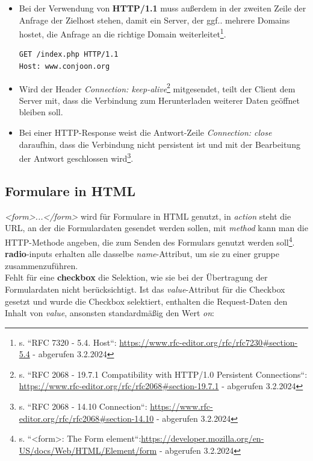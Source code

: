 \begin{itemize}
    \item Bei der Verwendung von \textbf{HTTP/1.1} muss außerdem in der zweiten Zeile der Anfrage der Zielhost stehen, damit ein Server, der {ggf..} mehrere Domains hostet, die Anfrage an die richtige Domain weiterleitet\footnote{s. ``RFC 7320 - 5.4.  Host``: \url{https://www.rfc-editor.org/rfc/rfc7230#section-5.4} - abgerufen 3.2.2024}.
    \begin{verbatim}
GET /index.php HTTP/1.1
Host: www.conjoon.org
    \end{verbatim}
    \item Wird der Header \textit{Connection: keep-alive}\footnote{
    s. ``RFC 2068 - 19.7.1 Compatibility with HTTP/1.0 Persistent Connections``: \url{https://www.rfc-editor.org/rfc/rfc2068#section-19.7.1} - abgerufen 3.2.2024
    } mitgesendet, teilt der Client dem Server mit, dass die Verbindung zum Herunterladen weiterer Daten geöffnet bleiben soll.
    \item Bei einer HTTP-Response weist die Antwort-Zeile \textit{Connection: close} daraufhin, dass die Verbindung nicht persistent ist und mit der Bearbeitung der Antwort geschlossen wird\footnote{
    s. ``RFC 2068 - 14.10 Connection``: \url{https://www.rfc-editor.org/rfc/rfc2068#section-14.10} - abgerufen 3.2.2024
    }.
\end{itemize}

\subsection{Formulare in HTML}

\textit{<form>...</form>} wird für Formulare in HTML genutzt, in \textit{action} steht die URL, an der die Formulardaten gesendet werden sollen, mit \textit{method} kann man die HTTP-Methode angeben, die zum Senden des Formulars genutzt werden soll\footnote{
s. ``<form>: The Form element``:\url{https://developer.mozilla.org/en-US/docs/Web/HTML/Element/form} - abgerufen 3.2.2024
}.\\

\noindent
\textbf{radio}-inputs erhalten alle dasselbe \textit{name}-Attribut, um sie zu einer gruppe zusammenzuführen.\\

\noindent
Fehlt für eine \textbf{checkbox} die Selektion, wie sie bei der Übertragung der Formulardaten nicht berücksichtigt.
Ist das \textit{value}-Attribut für die Checkbox gesetzt und wurde die Checkbox selektiert, enthalten die Request-Daten den Inhalt von \textit{value}, ansonsten standardmäßig den Wert \textit{on}:

